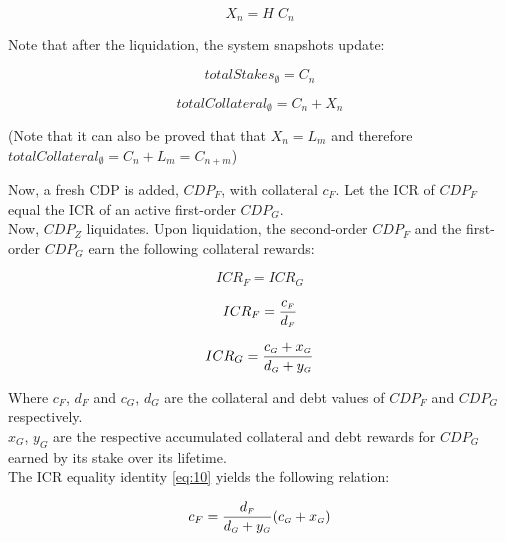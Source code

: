 \documentclass[reqno]{article}
\begin{document}
\begin{equation} \label{eq:47}
    X_n=H \; C_n
\end{equation}

\bigskip
Note that after the liquidation, the system snapshots update:

\begin{equation} \label{eq:8}
    totalStakes_\emptyset=C_n
\end{equation}

\begin{equation} \label{eq:9}
    totalCollateral_\emptyset=C_n+X_n
\end{equation}

\bigskip
(Note that it can also be proved that that $X_n=L_m$ and therefore $totalCollateral_\emptyset=C_n+L_m=C_{n+m}$)

\bigskip
Now, a fresh CDP is added, $CDP_F$, with collateral $c_F$.  Let the ICR of $CDP_F$ equal the ICR of an active first-order $CDP_G$.\\

Now, $CDP_Z$ liquidates. Upon liquidation, the second-order $CDP_F$ and the first-order $CDP_G$ earn the following collateral rewards:

\begin{equation} \label{eq:10}
    ICR_F=ICR_G
\end{equation}

\begin{equation} 
    ICR_F=\frac{c_\mathsmaller{F}}{d_\mathsmaller{F}}
\end{equation}

\begin{equation} 
    ICR_G=\frac{c_\mathsmaller{G}+x_\mathsmaller{G}}{d_\mathsmaller{G}+y_\mathsmaller{G}}
\end{equation}

\bigskip
Where $c_F$, $d_F$ and $c_G$, $d_G$ are the collateral and debt values of $CDP_F$ and $CDP_G$ respectively.\\

$x_G$, $y_G$ are the respective accumulated collateral and debt rewards for $CDP_G$ earned by its stake over its lifetime.\\

The ICR equality identity \ref{eq:10} yields the following relation:

\begin{equation} 
        c_F=\frac{d_\mathsmaller{F}}{d_\mathsmaller{G}+y_\mathsmaller{G}}(c_\mathsmaller{G}+x_\mathsmaller{G})
\end{equation}
\end{document}
